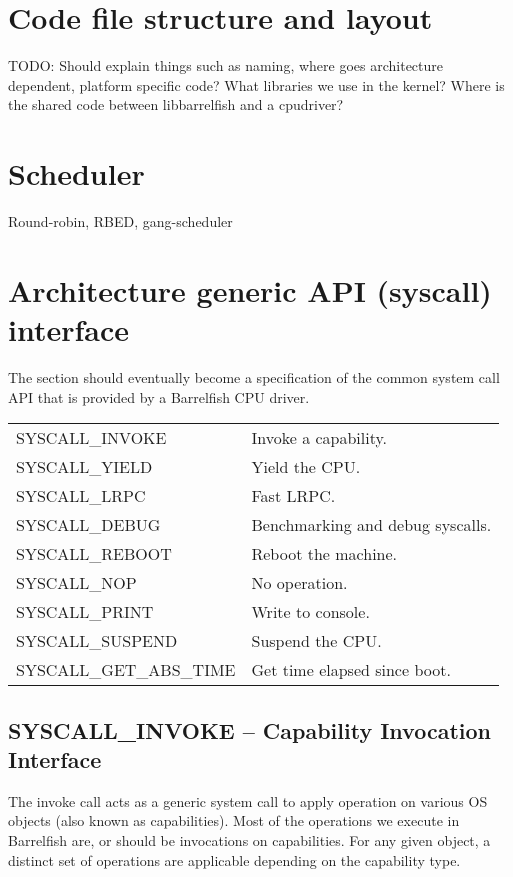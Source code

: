 \documentclass[a4paper,11pt,twoside]{report}
\begin{document}
{{\section{Code file structure and layout}
TODO: Should explain things such as naming, where goes architecture dependent, platform specific code?
What libraries we use in the kernel? Where is the shared code between libbarrelfish and a cpudriver?

\section{Scheduler}
Round-robin, RBED, gang-scheduler

\section{Architecture generic API (syscall) interface}

The section should eventually become a specification of the common system call
API that is provided by a Barrelfish CPU driver.

\begin{tabular}{|p{5cm}|>{\raggedright\arraybackslash}p{7cm}|}
\hline

SYSCALL\_INVOKE & Invoke a capability. \\
SYSCALL\_YIELD & Yield the CPU. \\
SYSCALL\_LRPC & Fast LRPC. \\
SYSCALL\_DEBUG & Benchmarking and debug syscalls. \\
SYSCALL\_REBOOT & Reboot the machine. \\
SYSCALL\_NOP & No operation. \\
SYSCALL\_PRINT & Write to console. \\
SYSCALL\_SUSPEND & Suspend the CPU. \\
SYSCALL\_GET\_ABS\_TIME & Get time elapsed since boot. \\

\hline
\end{tabular}

\subsection{SYSCALL\_INVOKE -- Capability Invocation Interface}

The invoke call acts as a generic system call to apply operation on various
OS objects (also known as capabilities). Most of the operations we execute in
Barrelfish are, or should be invocations on capabilities. For any given
object, a distinct set of operations are applicable depending on the
capability type.

}}
\end{document}
